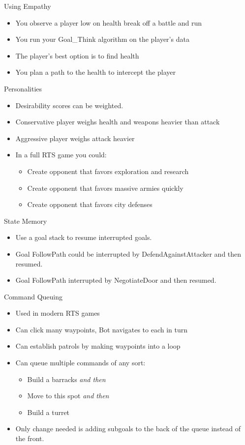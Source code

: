 \documentclass[t,compress]{beamer}
\newcommand{\bframe}[1]{\begin{frame}[fragile]{#1}}
\newcommand{\bi}{\begin{itemize}}
\newcommand{\ei}{\end{itemize}}
\begin{document}
\begin{centering}
\bframe{Using Empathy}
\bi
\item You observe a player low on health break off a battle and run
\item You run your Goal\_Think algorithm on the player's data
\item The player's best option is to find health
\item You plan a path to the health to intercept the player
\ei
\end{frame}

\bframe{Personalities}
\bi
\item Desirability scores can be weighted.
\item Conservative player weighs health and weapons heavier than attack
\item Aggressive player weighs attack heavier
\item In a full RTS game you could:
  \bi
  \item Create opponent that favors exploration and research
  \item Create opponent that favors massive armies quickly
  \item Create opponent that favors city defenses
  \ei
\ei
\end{frame}

\bframe{State Memory}
\bi
\item Use a goal stack to resume interrupted goals.
\item Goal FollowPath could be interrupted by DefendAgainstAttacker
  and then resumed.
\item Goal FollowPath interrupted by NegotiateDoor and then resumed.
\ei
\end{frame}

\bframe{Command Queuing}
\bi
\item Used in modern RTS games
\item Can click many waypoints, Bot navigates to each in turn
\item Can establish patrols by making waypoints into a loop
\item Can queue multiple commands of any sort:
  \bi
  \item Build a barracks {\em and then}
  \item Move to this spot {\em and then}
  \item Build a turret
  \ei
\item Only change needed is adding subgoals to the back of the queue
  instead of the front.
\ei
\end{frame}


\end{centering}
\end{document}
